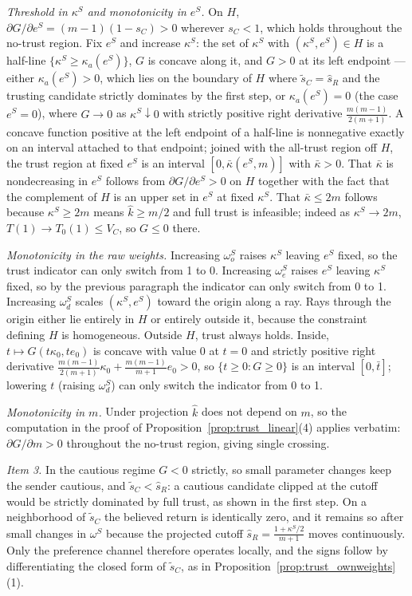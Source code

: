 \documentclass[11pt]{article}
\theoremstyle{plain}
\theoremstyle{remark}
\begin{document}
\emph{Threshold in $\kappa^S$ and monotonicity in $e^S$.}  On $H$, $\partial G/\partial e^S=(m-1)(1-s_C)>0$ wherever $s_C<1$, which holds throughout the no-trust region.  Fix $e^S$ and increase $\kappa^S$: the set of $\kappa^S$ with $(\kappa^S,e^S)\in H$ is a half-line $\{\kappa^S\ge \kappa_a(e^S)\}$, $G$ is concave along it, and $G>0$ at its left endpoint --- either $\kappa_a(e^S)>0$, which lies on the boundary of $H$ where $\tilde s_C=\hat s_R$ and the trusting candidate strictly dominates by the first step, or $\kappa_a(e^S)=0$ (the case $e^S=0$), where $G\to0$ as $\kappa^S\downarrow0$ with strictly positive right derivative $\frac{m(m-1)}{2(m+1)}$.  A concave function positive at the left endpoint of a half-line is nonnegative exactly on an interval attached to that endpoint; joined with the all-trust region off $H$, the trust region at fixed $e^S$ is an interval $[0,\bar\kappa(e^S,m)]$ with $\bar\kappa>0$.  That $\bar\kappa$ is nondecreasing in $e^S$ follows from $\partial G/\partial e^S>0$ on $H$ together with the fact that the complement of $H$ is an upper set in $e^S$ at fixed $\kappa^S$.  That $\bar\kappa\le2m$ follows because $\kappa^S\ge2m$ means $\hat k\ge m/2$ and full trust is infeasible; indeed as $\kappa^S\to2m$, $T(1)\to T_0(1)\le V_C$, so $G\le0$ there.

\emph{Monotonicity in the raw weights.}  Increasing $\omega_o^S$ raises $\kappa^S$ leaving $e^S$ fixed, so the trust indicator can only switch from 1 to 0.  Increasing $\omega_e^S$ raises $e^S$ leaving $\kappa^S$ fixed, so by the previous paragraph the indicator can only switch from 0 to 1.  Increasing $\omega_d^S$ scales $(\kappa^S,e^S)$ toward the origin along a ray.  Rays through the origin either lie entirely in $H$ or entirely outside it, because the constraint defining $H$ is homogeneous.  Outside $H$, trust always holds.  Inside, $t\mapsto G(t\kappa_0,te_0)$ is concave with value $0$ at $t=0$ and strictly positive right derivative $\frac{m(m-1)}{2(m+1)}\kappa_0+\frac{m(m-1)}{m+1}e_0>0$, so $\{t\ge0:G\ge0\}$ is an interval $[0,\bar t]$; lowering $t$ (raising $\omega_d^S$) can only switch the indicator from 0 to 1.

\emph{Monotonicity in $m$.}  Under projection $\hat k$ does not depend on $m$, so the computation in the proof of Proposition~\ref{prop:trust_linear}(4) applies verbatim: $\partial G/\partial m>0$ throughout the no-trust region, giving single crossing.

\emph{Item 3.}  In the cautious regime $G<0$ strictly, so small parameter changes keep the sender cautious, and $\tilde s_C<\hat s_R$: a cautious candidate clipped at the cutoff would be strictly dominated by full trust, as shown in the first step.  On a neighborhood of $\tilde s_C$ the believed return is identically zero, and it remains so after small changes in $\omega^S$ because the projected cutoff $\hat s_R=\frac{1+\kappa^S/2}{m+1}$ moves continuously.  Only the preference channel therefore operates locally, and the signs follow by differentiating the closed form of $\tilde s_C$, as in Proposition~\ref{prop:trust_ownweights}(1).
\end{document}
